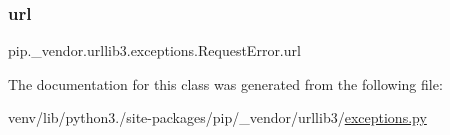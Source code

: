 \subsubsection{\texorpdfstring{url}{url}}
{\footnotesize\ttfamily pip.\+\_\+vendor.\+urllib3.\+exceptions.\+Request\+Error.\+url}



The documentation for this class was generated from the following file\+:\begin{DoxyCompactItemize}
\item 
venv/lib/python3./site-\/packages/pip/\+\_\+vendor/urllib3/\hyperlink{pip_2__vendor_2urllib3_2exceptions_8py}{exceptions.\+py}\end{DoxyCompactItemize}
